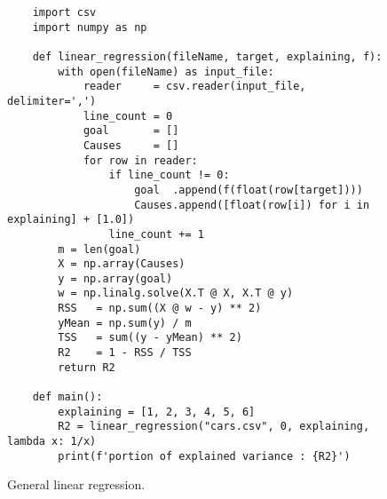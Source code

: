 \begin{figure}[!ht]
\centering
\begin{verbatim}
    import csv
    import numpy as np
    
    def linear_regression(fileName, target, explaining, f):
        with open(fileName) as input_file:
            reader     = csv.reader(input_file, delimiter=',')
            line_count = 0
            goal       = []
            Causes     = []
            for row in reader:
                if line_count != 0:  
                    goal  .append(f(float(row[target])))  
                    Causes.append([float(row[i]) for i in explaining] + [1.0]) 
                line_count += 1
        m = len(goal)
        X = np.array(Causes)
        y = np.array(goal)
        w = np.linalg.solve(X.T @ X, X.T @ y)
        RSS   = np.sum((X @ w - y) ** 2)
        yMean = np.sum(y) / m
        TSS   = sum((y - yMean) ** 2)
        R2    = 1 - RSS / TSS
        return R2
    
    def main():
        explaining = [1, 2, 3, 4, 5, 6]
        R2 = linear_regression("cars.csv", 0, explaining, lambda x: 1/x)
        print(f'portion of explained variance : {R2}')
\end{verbatim}
\vspace*{-0.3cm}
\caption{General linear regression.}
\label{fig:linear-regression.stlx}
\end{figure}

